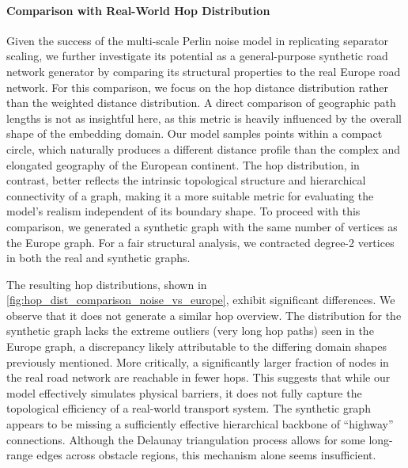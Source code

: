 \paragraph{Comparison with Real-World Hop Distribution}

Given the success of the multi-scale Perlin noise model in replicating separator scaling, we further investigate its potential as a general-purpose synthetic road network generator by comparing its structural properties to the real Europe road network.
For this comparison, we focus on the hop distance distribution rather than the weighted distance distribution.
A direct comparison of geographic path lengths is not as insightful here, as this metric is heavily influenced by the overall shape of the embedding domain.
Our model samples points within a compact circle, which naturally produces a different distance profile than the complex and elongated geography of the European continent.
The hop distribution, in contrast, better reflects the intrinsic topological structure and hierarchical connectivity of a graph, making it a more suitable metric for evaluating the model's realism independent of its boundary shape.
To proceed with this comparison, we generated a synthetic graph with the same number of vertices as the Europe graph.
For a fair structural analysis, we contracted degree-2 vertices in both the real and synthetic graphs.

The resulting hop distributions, shown in \cref{fig:hop_dist_comparison_noise_vs_europe}, exhibit significant differences.
We observe that it does not generate a similar hop overview.
The distribution for the synthetic graph lacks the extreme outliers (very long hop paths) seen in the Europe graph, a discrepancy likely attributable to the differing domain shapes previously mentioned.
More critically, a significantly larger fraction of nodes in the real road network are reachable in fewer hops.
This suggests that while our model effectively simulates physical barriers, it does not fully capture the topological efficiency of a real-world transport system.
The synthetic graph appears to be missing a sufficiently effective hierarchical backbone of \enquote{highway} connections.
Although the Delaunay triangulation process allows for some long-range edges across obstacle regions, this mechanism alone seems insufficient.


